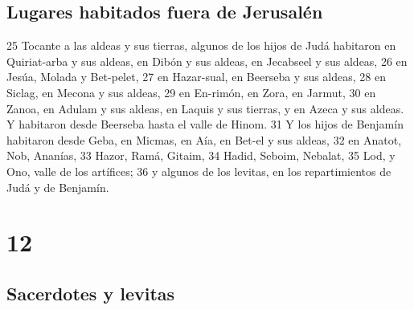 \section*{Lugares habitados fuera de Jerusalén}

25 Tocante a las aldeas y sus tierras, algunos de los hijos de Judá habitaron en Quiriat-arba y sus aldeas, en Dibón y sus aldeas, en Jecabseel y sus aldeas,
26 en Jesúa, Molada y Bet-pelet,
27 en Hazar-sual, en Beerseba y sus aldeas,
28 en Siclag, en Mecona y sus aldeas,
29 en En-rimón, en Zora, en Jarmut,
30 en Zanoa, en Adulam y sus aldeas, en Laquis y sus tierras, y en Azeca y sus aldeas. Y habitaron desde Beerseba hasta el valle de Hinom.
31 Y los hijos de Benjamín habitaron desde Geba, en Micmas, en Aía, en Bet-el y sus aldeas,
32 en Anatot, Nob, Ananías,
33 Hazor, Ramá, Gitaim,
34 Hadid, Seboim, Nebalat,
35 Lod, y Ono, valle de los artífices;
36 y algunos de los levitas, en los repartimientos de Judá y de Benjamín.

\chapter{12}

\section*{Sacerdotes y levitas}

